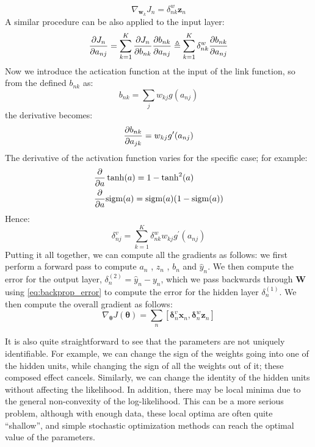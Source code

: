 \begin{equation}
    \nabla_{\bm{w}_k} J_n = \delta_{nk}^w \bm{z}_n
\end{equation}
A similar procedure can be also applied to the input layer:
\begin{equation}
    \pdv{J_n}{a_{nj}} = \sum_{k=1}^K \pdv{J_n}{b_{nk}}\pdv{b_{nk}}{a_{nj}} 
    \triangleq \sum_{k=1}^K \delta_{nk}^w \pdv{b_{nk}}{a_{nj}}
\end{equation}
Now we introduce the actication function at the input of the link function, so from the defined $b_{nk}$ as:
\begin{equation}
    b_{nk} = \sum_j w_{kj} g( a_{nj} )
\end{equation}
the derivative becomes:
\begin{equation}
    \pdv{b_{nk}}{a_{jk}} = w_{kj} g^\prime(a_{nj})
\end{equation}
The derivative of the activation function varies for the specific case; for example:
\begin{align*}
    & \pdv{}{a} \tanh(a) = 1-\tanh^2(a) \\
    & \pdv{}{a} \text{sigm}(a) = \text{sigm}(a)(1-\text{sigm}(a))
\end{align*}
Hence:
\begin{equation}
    \delta_{nj}^v = \sum_{k=1}^K \delta_{nk}^w w_{kj} g^{\prime}(a_{nj})
    \label{eq:backprop_error}
\end{equation}
Putting it all together, we can compute all the gradients as follows: we first perform a forward pass to compute $a_n$ , $z_n$ , $b_n$ and $\hat{y}_n$. We then compute the error for the output layer, $\delta_n^{(2)} = \hat{y}_n - y_n$, which we pass backwards through $\bm{W}$ using \eqref{eq:backprop_error} to compute the error for the hidden layer $\delta_n^{(1)}$. We then compute the overall gradient as follows:
\begin{equation}
    \nabla_{\bm{\theta}} J(\bm{\theta}) = \sum_n \left[ \bm{\delta}_n^v \bm{x}_n, \bm{\delta}_n^w \bm{z}_n \right]
\end{equation}

It is also quite straightforward to see that the parameters are not uniquely identifiable. For example, we can change the sign of the weights going into one of the hidden units, while changing the sign of all the weights out of it; these composed effect cancels. Similarly, we can change the identity of the hidden units without affecting the likelihood. 
In addition, there may be local minima due to the general non-convexity of the log-likelihood. This can be a more serious problem, although with enough data, these local optima are often quite “shallow”, and simple stochastic optimization methods can reach the optimal value of the parameters.



